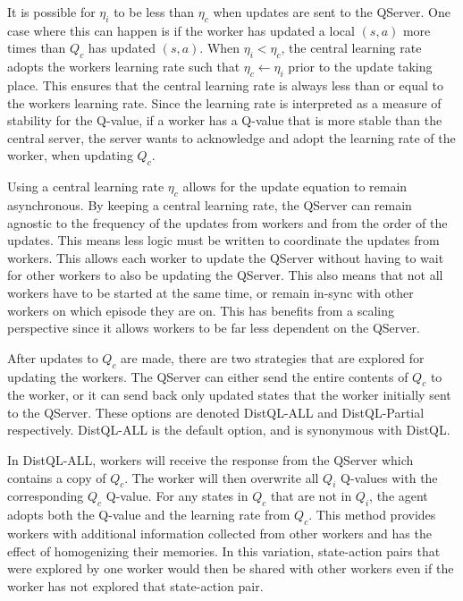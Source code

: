 \documentclass[jair,twoside,11pt,theapa]{article}
\begin{document}
It is possible for $\eta_i$ to be less than $\eta_c$ when updates are sent to the QServer. One case where this can happen is if the worker has updated a local $(s,a)$ more times than $Q_c$ has updated $(s,a)$. When $\eta_i < \eta_c$, the central learning rate adopts the workers learning rate such that $\eta_c \leftarrow \eta_i$ prior to the update taking place. This ensures that the central learning rate is always less than or equal to the workers learning rate. Since the learning rate is interpreted as a measure of stability for the Q-value, if a worker has a Q-value that is more stable than the central server, the server wants to acknowledge and adopt the learning rate of the worker, when updating $Q_c$.


Using a central learning rate $\eta_c$ allows for the update equation to remain asynchronous. By keeping a central learning rate, the QServer can remain agnostic to the frequency of the updates from workers and from the order of the updates. This means less logic must be written to coordinate the updates from workers. This allows each worker to update the QServer without having to wait for other workers to also be updating the QServer. This also means that not all workers have to be started at the same time, or remain in-sync with other workers on which episode they are on. This has benefits from a scaling perspective since it allows workers to be far less dependent on the QServer. 

After updates to $Q_c$ are made, there are two strategies that are explored for updating the workers. The QServer can either send the entire contents of $Q_c$ to the worker, or it can send back only updated states that the worker initially sent to the QServer. These options are denoted DistQL-ALL and DistQL-Partial respectively. DistQL-ALL is the default option, and is synonymous with DistQL. 

In DistQL-ALL, workers will receive the response from the QServer which contains a copy of $Q_c$. The worker will then overwrite all $Q_i$ Q-values with the corresponding $Q_c$ Q-value. For any states in $Q_c$ that are not in $Q_i$, the agent adopts both the Q-value and the learning rate from $Q_c$. This method provides workers with additional information collected from other workers and has the effect of homogenizing their memories. In this variation, state-action pairs that were explored by one worker would then be shared with other workers even if the worker has not explored that state-action pair.
\end{document}
